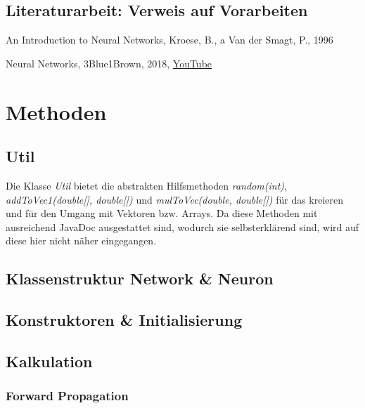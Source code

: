 \documentclass[paper=A4,pagesize=auto,12pt,headinclude=true,footinclude=true,BCOR=0mm,DIV=calc]{scrartcl}
\begin{document}
\subsection{Literaturarbeit: Verweis auf Vorarbeiten}
\begin{itemize}
	\item{An Introduction to Neural Networks, Kroese, B., a Van der Smagt, P., 1996}
	\hypertarget{3b1b}{\item{Neural Networks, 3Blue1Brown, 2018, \hyperref{https://www.youtube.com/playlist?list=PLZHQObOWTQDNU6R1_67000Dx_ZCJB-3pi}{}{}{YouTube}}}
\end{itemize}


\newpage

\section{Methoden} %
\subsection{Util}
Die Klasse \textit{Util} bietet die abstrakten Hilfsmethoden \textit{random(int)}, \textit{addToVec1(double[], double[])} und \textit{mulToVec(double, double[])} für das kreieren und für den Umgang mit Vektoren bzw. Arrays. Da diese Methoden mit ausreichend JavaDoc ausgestattet sind, wodurch sie selbsterklärend sind, wird auf diese hier nicht näher eingegangen.

\subsection{Klassenstruktur Network \& Neuron}

\subsection{Konstruktoren \& Initialisierung}

\subsection{Kalkulation}
\hypertarget{forwardprop}{\subsubsection{Forward Propagation}}
\end{document}
